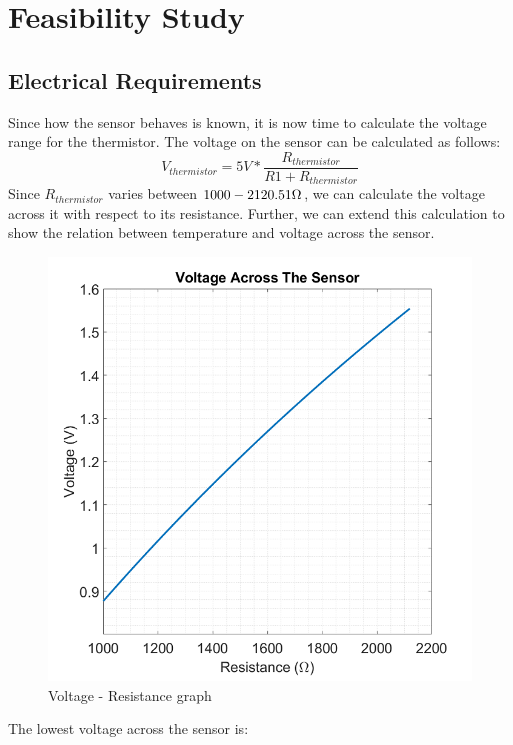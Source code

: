 \section*{Feasibility Study}

\subsection*{Electrical Requirements}
Since how the sensor behaves is known, it is now time to calculate the voltage range for the thermistor. The voltage on the sensor can be calculated as follows:
\begin{equation}
    V_{thermistor} = 5V * \frac{R_{thermistor}}{R1 + R_{thermistor}}
\end{equation}
Since $R_{thermistor}$ varies between $1000 - 2120.51 \ohm$, we can calculate the voltage across it with respect to its resistance. Further, we can extend this calculation to show the relation between temperature and voltage across the sensor.
\begin{figure}[H]
    \centering
    \includegraphics[scale=0.4]{../pics/ptc_res_volt}
    \caption{Voltage - Resistance graph}
\end{figure}
The lowest voltage across the sensor is:
